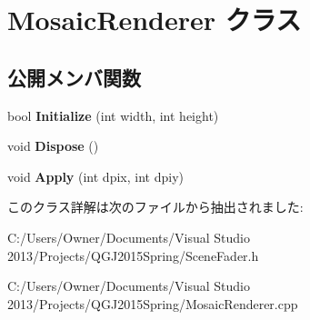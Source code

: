 \hypertarget{class_mosaic_renderer}{}\section{Mosaic\+Renderer クラス}
\label{class_mosaic_renderer}
\subsection*{公開メンバ関数}
\begin{DoxyCompactItemize}
\item 
bool {\bfseries Initialize} (int width, int height)\hypertarget{class_mosaic_renderer_a29cff72647c6d2b17afc2852b500e6eb}{}\label{class_mosaic_renderer_a29cff72647c6d2b17afc2852b500e6eb}

\item 
void {\bfseries Dispose} ()\hypertarget{class_mosaic_renderer_ac12b8b84846dba2f8cbf662376478517}{}\label{class_mosaic_renderer_ac12b8b84846dba2f8cbf662376478517}

\item 
void {\bfseries Apply} (int dpix, int dpiy)\hypertarget{class_mosaic_renderer_a2b9242fb58b4353670d2ae5c93fe5b96}{}\label{class_mosaic_renderer_a2b9242fb58b4353670d2ae5c93fe5b96}

\end{DoxyCompactItemize}


このクラス詳解は次のファイルから抽出されました\+:\begin{DoxyCompactItemize}
\item 
C\+:/\+Users/\+Owner/\+Documents/\+Visual Studio 2013/\+Projects/\+Q\+G\+J2015\+Spring/Scene\+Fader.\+h\item 
C\+:/\+Users/\+Owner/\+Documents/\+Visual Studio 2013/\+Projects/\+Q\+G\+J2015\+Spring/Mosaic\+Renderer.\+cpp\end{DoxyCompactItemize}
